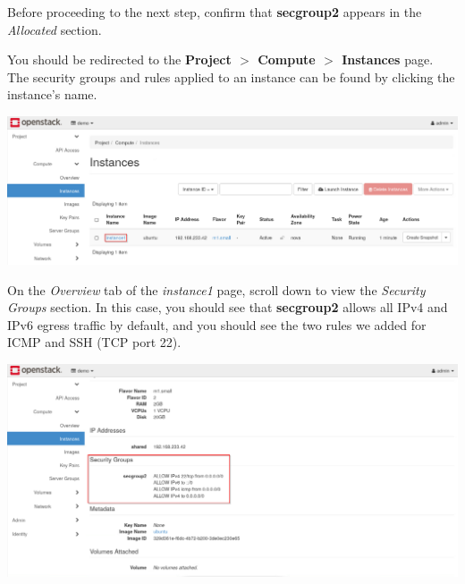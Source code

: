 \documentclass[letterpaper, 12pt]{article}
\begin{document}
\begin{enumerate}
    \begin{stopbox}
        Before proceeding to the next step, confirm that \textbf{secgroup2} appears in the \textit{Allocated} section.
    \end{stopbox}

    \begin{labstep}
        You should be redirected to the \textbf{Project $>$ Compute $>$ Instances} page.
        The security groups and rules applied to an instance can be found by clicking the instance's name.

        \begin{center}
            \includegraphics[width=\linewidth]{images/part6/step16.png}
        \end{center}
    \end{labstep}

    \begin{labstep}
        On the \textit{Overview} tab of the \textit{instance1} page, scroll down to view the \textit{Security Groups} section.
        In this case, you should see that \textbf{secgroup2} allows all IPv4 and IPv6 egress traffic by default, and you should see the two rules we added for ICMP and SSH (TCP port 22).

        \begin{center}
            \includegraphics[width=\linewidth]{images/part6/step17.png}
        \end{center}
    \end{labstep}


\end{enumerate}
\end{document}
